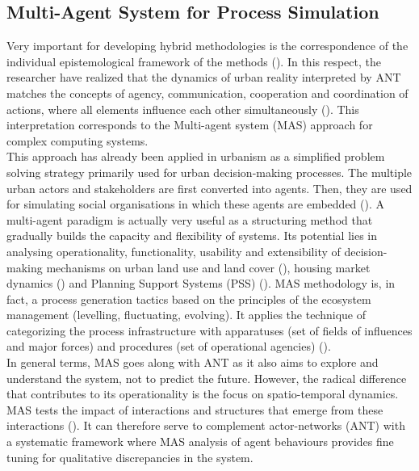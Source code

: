 \documentclass[11pt]{report}
\begin{document}
\subsection{Multi-Agent System for Process Simulation}

Very important for developing hybrid methodologies is the correspondence of the individual epistemological framework of the methods (\cite{mixed method}). In this respect, the researcher have realized that the dynamics of urban reality interpreted by ANT matches the concepts of agency, communication, cooperation and coordination of actions, where all elements influence each other simultaneously (\href{Ferber}{\citealt{ferber_multi-agent_1999}}).
This interpretation corresponds to the Multi-agent system (MAS) approach for complex computing systems.
\\

This approach has already been applied in urbanism as a simplified problem solving strategy primarily used for urban decision-making processes. The multiple urban actors and stakeholders are first converted into agents. Then, they are used for simulating social organisations in which these agents are embedded (\href{Bousquet}{\citealt{bousquet_multi-agent_2004}}). A multi-agent paradigm is actually very useful as a structuring method that gradually builds the capacity and flexibility of systems.
Its potential lies in analysing  operationality, functionality, usability and extensibility of decision-making mechanisms on urban land use and land cover (\href{Brown}{\citealt{brown_path_2005}}), housing market dynamics (\href{Diappi}{\citealt{diappi_smiths_2008}}) and Planning Support Systems (PSS) (\href{Saarloos}{\citealt{saarloos_multi-agent_2008}}). MAS methodology is, in fact, a process generation tactics based on the principles of the ecosystem management (levelling, fluctuating, evolving). It applies the technique of categorizing the process infrastructure with apparatuses (set of fields of influences and major forces) and procedures (set of operational agencies) (\href{Bousquet}{\citealt{bousquet_multi-agent_2004}}).
\\

In general terms, MAS goes along with ANT as it also aims to explore and understand the system, not to predict the future.
However, the radical difference that contributes to its operationality is the focus on spatio-temporal dynamics. MAS tests the impact of interactions and structures that emerge from these interactions (\href{Crooks}{\citealt{crooks_multi-agent_2014}}). It can therefore serve to complement actor-networks (ANT) with a systematic framework where MAS analysis of agent behaviours provides fine tuning for qualitative discrepancies in the system. 
\\
\end{document}
